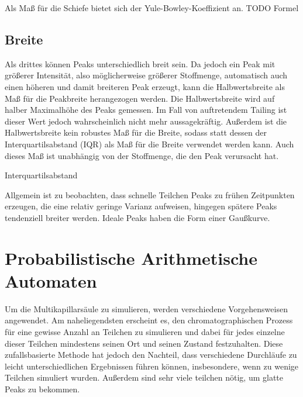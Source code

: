 Als Maß für die Schiefe bietet sich der Yule-Bowley-Koeffizient an. TODO Formel

\subsection{Breite}
Als drittes können Peaks unterschiedlich breit sein. Da jedoch ein Peak mit größerer Intensität, also möglicherweise größerer Stoffmenge, automatisch auch einen höheren und damit breiteren Peak erzeugt, kann die Halbwertsbreite als Maß für die Peakbreite herangezogen werden. Die Halbwertsbreite wird auf halber Maximalhöhe des Peaks gemessen. Im Fall von auftretendem Tailing ist dieser Wert jedoch wahrscheinlich nicht mehr aussagekräftig. Außerdem ist die Halbwertsbreite kein robustes Maß für die Breite, sodass statt dessen der Interquartilsabstand (IQR) als Maß für die Breite verwendet werden kann. Auch dieses Maß ist unabhängig von der Stoffmenge, die den Peak verursacht hat. 

 Interquartilsabstand 

 
Allgemein ist zu beobachten, dass schnelle Teilchen Peaks zu frühen Zeitpunkten erzeugen, die eine relativ geringe Varianz aufweisen, hingegen spätere Peaks tendenziell breiter werden. Ideale Peaks haben die Form einer Gaußkurve. 

\section{Probabilistische Arithmetische Automaten}
Um die Multikapillarsäule zu simulieren, werden verschiedene Vorgehensweisen angewendet. Am naheliegendsten erscheint es, den chromatographischen Prozess für eine gewisse Anzahl an Teilchen zu simulieren und dabei für jedes einzelne dieser Teilchen mindestens seinen Ort und seinen Zustand festzuhalten. Diese zufallsbasierte Methode hat jedoch den Nachteil, dass verschiedene Durchläufe zu leicht unterschiedlichen Ergebnissen führen können, insbesondere, wenn zu wenige Teilchen simuliert wurden.
Außerdem sind sehr viele teilchen nötig, um glatte Peaks zu bekommen.

